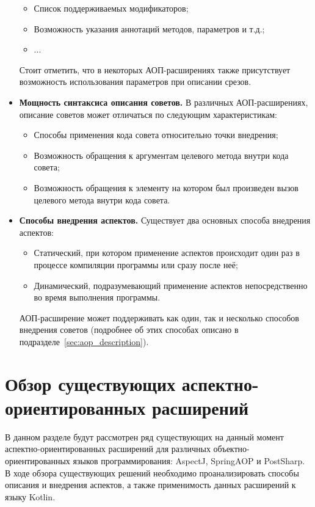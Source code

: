 \begin{itemize}
\begin{itemize}
      \item Список поддерживаемых модификаторов;
      \item Возможность указания аннотаций методов, параметров и т.д.;
      \item ...
  \end{itemize}
  Стоит отметить, что в некоторых АОП-расширениях также присутствует возможность использования параметров при описании срезов.
\item \textbf{Мощность синтаксиса описания советов.}
  В различных АОП-расширениях, описание советов может отличаться по следующим характеристикам:
  \begin{itemize}
      \item Способы применения кода совета относительно точки внедрения;
      \item Возможность обращения к аргументам целевого метода внутри кода совета;
      \item Возможность обращения к элементу на котором был произведен вызов целевого метода внутри кода совета.
  \end{itemize}
\item \textbf{Способы внедрения аспектов.}
  Существует два основных способа внедрения аспектов:
  \begin{itemize}
      \item Статический, при котором применение аспектов происходит один раз в процессе компиляции программы или сразу после неё;
      \item Динамический, подразумевающий применение аспектов непосредственно во время выполнения программы.
  \end{itemize}
  АОП-расширение может поддерживать как один, так и несколько способов внедрения
  советов (подробнее об этих способах описано в подразделе~\ref{sec:aop_description}).
\end{itemize}
\section{Обзор существующих аспектно-ориентированных расширений}
\label{sec:aop_extension_overwiev}
В данном разделе будут рассмотрен ряд существующих на данный момент
аспектно-ориентированных расширений для различных объектно-ориентированных
языков программирования: AspectJ, SpringAOP и PostSharp.
В ходе обзора существующих решений необходимо проанализировать способы описания и внедрения аспектов, а также применимость данных расширений к языку Kotlin.
